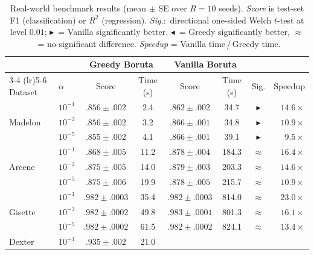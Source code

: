 \documentclass[runningheads]{llncs}
\begin{document}
\begin{table}
\caption{Real-world benchmark results (mean $\pm$ SE over $R=10$ seeds).
\emph{Score} is test-set F1 (classification) or $R^2$ (regression).
\emph{Sig.}:\ directional one-sided Welch $t$-test at level $0.01$;
$\blacktriangleright$~= Vanilla significantly better,
$\blacktriangleleft$~= Greedy significantly better,
$\approx$~= no significant difference.
\emph{Speedup} = Vanilla time\,/\,Greedy time.}
\label{tab:realworld_results}
\centering
\small
\begin{tabular}{ll cc cc c r}
\toprule
& & \multicolumn{2}{c}{Greedy Boruta}
& \multicolumn{2}{c}{Vanilla Boruta} & & \\
\cmidrule(lr){3-4} \cmidrule(lr){5-6}
Dataset & $\alpha$ & Score & Time (s)
                   & Score & Time (s)
                   & Sig. & Speedup \\
\midrule
\multirow{3}{*}{Madelon}
  & $10^{-1}$  & $.856 \pm .002$ & 2.4
               & $.862 \pm .002$ & 34.7
               & $\blacktriangleright$ & $14.6\times$ \\
  & $10^{-3}$  & $.856 \pm .002$ & 3.2
               & $.866 \pm .001$ & 34.8
               & $\blacktriangleright$ & $10.9\times$ \\
  & $10^{-5}$  & $.855 \pm .002$ & 4.1
               & $.866 \pm .001$ & 39.1
               & $\blacktriangleright$ & $9.5\times$ \\
\midrule
\multirow{3}{*}{Arcene}
  & $10^{-1}$  & $.868 \pm .005$ & 11.2
               & $.878 \pm .004$ & 184.3
               & $\approx$ & $16.4\times$ \\
  & $10^{-3}$  & $.875 \pm .005$ & 14.0
               & $.879 \pm .003$ & 203.3
               & $\approx$ & $14.6\times$ \\
  & $10^{-5}$  & $.875 \pm .006$ & 19.9
               & $.878 \pm .005$ & 215.7
               & $\approx$ & $10.9\times$ \\
\midrule
\multirow{3}{*}{Gisette}
  & $10^{-1}$  & $.982 \pm .0003$ & 35.4
               & $.982 \pm .0003$ & 814.0
               & $\approx$ & $23.0\times$ \\
  & $10^{-3}$  & $.982 \pm .0002$ & 49.8
               & $.983 \pm .0001$ & 801.3
               & $\approx$ & $16.1\times$ \\
  & $10^{-5}$  & $.982 \pm .0002$ & 61.5
               & $.982 \pm .0002$ & 824.1
               & $\approx$ & $13.4\times$ \\
\midrule
\multirow{3}{*}{Dexter}
  & $10^{-1}$  & $.935 \pm .002$ & 21.0

\end{tabular}
\end{table}
\end{document}
